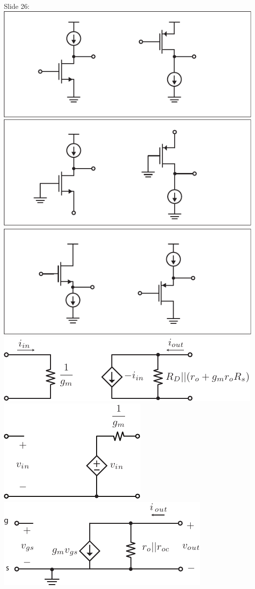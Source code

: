 Slide 26:
\includegraphics[width=.75\columnwidth]{ampchart}
\includegraphics[width=.75\columnwidth]{cg_model}
\includegraphics[width=.75\columnwidth]{cd_amp_model}
\includegraphics[width=.75\columnwidth]{csamp_model}

